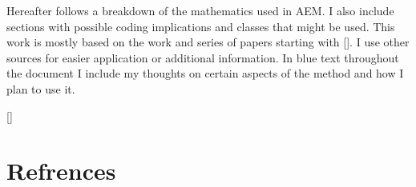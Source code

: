 \documentclass[a4paper,12pt]{article}
\begin{document}
Hereafter follows a breakdown of the mathematics used in AEM.  I also include sections with possible coding implications and classes that might be used.  This work is mostly based on the work and series of papers starting with [\cite{First_AEM}].  I use other sources for easier application or additional information.  In blue text throughout the document I include my thoughts on certain aspects of the method and how I plan to use it. 


\newpage

\newpage

\newpage



\newpage
{}[\refname]{%
\chapter*{Refrences}%
}
\printbibliography[heading=bibintoc]
\end{document}
